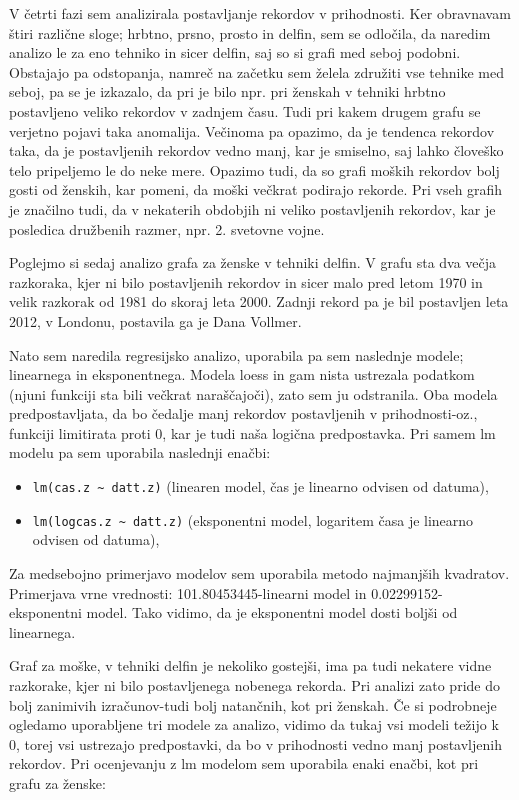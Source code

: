 \documentclass[11pt,a4paper]{article}
\begin{document}
V četrti fazi sem analizirala postavljanje rekordov v prihodnosti. Ker obravnavam štiri različne sloge; hrbtno, prsno, prosto in delfin, sem se odločila, da naredim analizo le za eno tehniko in sicer delfin, saj so si grafi med seboj podobni. Obstajajo pa odstopanja, namreč na začetku sem želela združiti vse tehnike med seboj, pa se je izkazalo, da pri je bilo npr. pri ženskah v tehniki hrbtno postavljeno veliko rekordov v zadnjem času. Tudi pri kakem drugem grafu se verjetno pojavi taka anomalija. Večinoma pa opazimo, da je tendenca rekordov taka, da je postavljenih rekordov vedno manj, kar je smiselno, saj lahko človeško telo pripeljemo le do neke mere. Opazimo tudi, da so grafi moških rekordov bolj gosti od ženskih, kar pomeni, da moški večkrat podirajo rekorde. Pri vseh grafih je značilno tudi, da v nekaterih obdobjih ni veliko postavljenih rekordov, kar je posledica družbenih razmer, npr. 2. svetovne vojne.

Poglejmo si sedaj analizo grafa za ženske v tehniki delfin. V grafu sta dva večja razkoraka, kjer ni bilo postavljenih rekordov in sicer malo pred letom 1970 in velik razkorak od 1981 do skoraj leta 2000. Zadnji rekord pa je bil postavljen leta 2012, v Londonu, postavila ga je Dana Vollmer.

Nato sem naredila regresijsko analizo, uporabila pa sem naslednje modele; linearnega in eksponentnega. Modela loess in gam nista ustrezala podatkom (njuni funkciji sta bili večkrat naraščajoči), zato sem ju odstranila. Oba modela predpostavljata, da bo čedalje manj rekordov postavljenih v prihodnosti-oz., funkciji limitirata proti 0, kar je tudi naša logična predpostavka. Pri samem lm modelu pa sem uporabila naslednji enačbi:

\begin{itemize}
\item{\verb|lm(cas.z ~ datt.z)| (linearen model, čas je linearno odvisen od datuma),}
\item{\verb|lm(logcas.z ~ datt.z)| (eksponentni model, logaritem časa je linearno odvisen od datuma),}
\end{itemize}

Za medsebojno primerjavo modelov sem uporabila metodo najmanjših kvadratov. Primerjava vrne vrednosti: 101.80453445-linearni model in 0.02299152-eksponentni model. Tako vidimo, da je eksponentni model dosti boljši od linearnega.


Graf za moške, v tehniki delfin je nekoliko gostejši, ima pa tudi nekatere vidne razkorake, kjer ni bilo postavljenega nobenega rekorda. Pri analizi zato pride do bolj zanimivih izračunov-tudi bolj natančnih, kot pri ženskah. Če si podrobneje ogledamo uporabljene tri modele za analizo, vidimo da tukaj vsi modeli težijo k 0, torej vsi ustrezajo predpostavki, da bo v prihodnosti vedno manj postavljenih rekordov. Pri ocenjevanju z lm modelom sem uporabila enaki enačbi, kot pri grafu za ženske:
\end{document}
